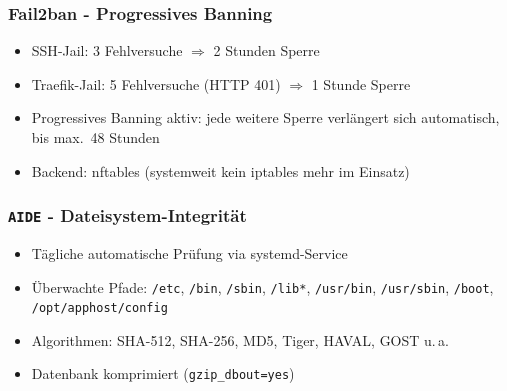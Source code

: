 \subsubsection*{Fail2ban - Progressives Banning}
\begin{itemize}
  \item \acs{SSH}-Jail: 3 Fehlversuche $\Rightarrow$ 2 Stunden Sperre
  \item Traefik-Jail: 5 Fehlversuche (HTTP 401) $\Rightarrow$ 1 Stunde Sperre
  \item Progressives Banning aktiv: jede weitere Sperre verlängert sich automatisch, bis max.\ 48 Stunden
  \item Backend: nftables (systemweit kein iptables mehr im Einsatz)
\end{itemize}

\subsubsection*{\texttt{AIDE} - Dateisystem-Integrität}
\begin{itemize}
  \item Tägliche automatische Prüfung via systemd-Service
  \item Überwachte Pfade: \texttt{/etc}, \texttt{/bin}, \texttt{/sbin}, \texttt{/lib*}, \texttt{/usr/bin}, \texttt{/usr/sbin}, \texttt{/boot}, \texttt{/opt/apphost/config}
  \item Algorithmen: \acs{SHA}-512, \acs{SHA}-256, \acs{MD5}, Tiger, \acs{HAVAL}, \acs{GOST} u.\,a.
  \item Datenbank komprimiert (\texttt{gzip\_dbout=yes})
\end{itemize}


